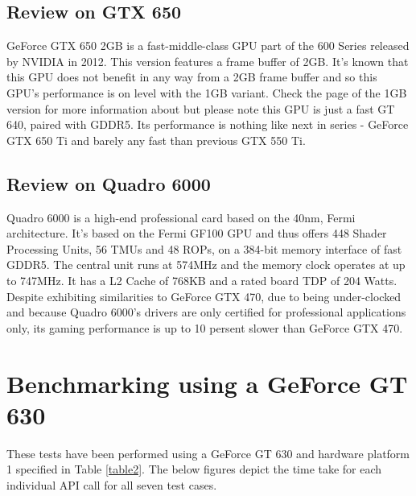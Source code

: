 \documentclass[paper=a4, fontsize=11pt]{scrartcl}
\numberwithin{equation}{section}		%
\numberwithin{figure}{section}			%
\numberwithin{table}{section}				%
\begin{document}
\subsection{Review on GTX 650}
GeForce GTX 650 2GB is a fast-middle-class GPU part of the 600 Series released by NVIDIA in 2012.
This version features a frame buffer of 2GB. It's known that this GPU does not benefit in any way from a 2GB frame buffer and so this GPU's performance is on level with the 1GB variant. Check the page of the 1GB version for more information about but please note this GPU is just a fast GT 640, paired with GDDR5. Its performance is nothing like next in series - GeForce GTX 650 Ti and barely any fast than previous GTX 550 Ti.

\subsection{Review on Quadro 6000}
Quadro 6000 is a high-end professional card based on the 40nm, Fermi architecture. It's based on the Fermi GF100 GPU and thus offers 448 Shader Processing Units, 56 TMUs and 48 ROPs, on a 384-bit memory interface of fast GDDR5. The central unit runs at 574MHz and the memory clock operates at up to 747MHz. It has a L2 Cache of 768KB and a rated board TDP of 204 Watts. 
Despite exhibiting similarities to GeForce GTX 470, due to being under-clocked and because Quadro 6000's drivers are only certified for professional applications only, its gaming performance is up to 10 persent slower than GeForce GTX 470.

\newpage
\section{Benchmarking using a GeForce GT 630}
These tests have been performed using a GeForce GT 630 and hardware platform 1 specified in Table \ref{table2}. The below figures depict the time take for each individual API call for all seven test cases.
\end{document}
